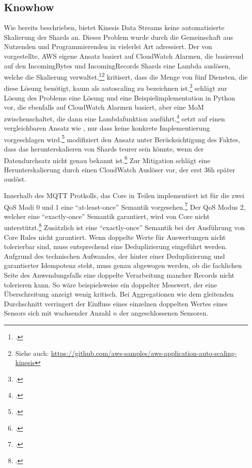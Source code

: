 \subsection{Knowhow}
Wie bereits beschrieben, bietet Kinesis Data Streams keine automatisierte Skalierung der Shards an. Dieses Problem wurde durch die Gemeinschaft aus Nutzenden und Programmierenden in vielerlei Art adressiert. Der von \citeauthor{AmazonWebServices.2018} vorgestellte, \ac{AWS} eigene Ansatz basiert auf CloudWatch Alarmen, die basierend auf den IncomingBytes und IncomingRecords Shards eine Lambda auslösen, welche die Skalierung verwaltet.\footcite[Vgl.][]{AmazonWebServices.2018}\nzitat\footnote{Siehe auch: \url{https://github.com/aws-samples/aws-application-auto-scaling-kinesis}} \citeauthor{Pogosova.28.05.2020} kritisert, dass die Menge von fünf Diensten, die diese Lösung benötigt, kaum als autoscaling zu bezeichnen ist.\footcite[Vgl.][]{Pogosova.28.05.2020} \citeauthor{Stanley.2019} schlägt zur Lösung des Problems eine Lösung und eine Beispielimplementation in Python vor, die ebenfalls auf CloudWatch Alarmen basiert, aber eine \ac{MoM} zwischenschaltet, die dann eine Lambdafunktion ausführt.\footcite[Vgl.][]{Stanley.2019} \citeauthor{Prasath.2019} setzt auf einen vergleichbaren Ansatz wie \citeauthor{Stanley.2019}, nur dass keine konkrete Implementierung vorgeschlagen wird.\footcite[Vgl.][]{Prasath.2019} \citeauthor{Cui.2017} modifiziert den Ansatz unter Berücksichtigung des Faktes, dass das herunterskalieren von Shards teurer sein könnte, wenn der Datendurchsatz nicht genau bekannt ist.\footcite[Vgl. auch im Folgendn][]{Cui.2017} Zur Mitigation schlägt \citeauthor{Cui.2017} eine Herunterskalierung durch einen CloudWatch Auslöser vor, der erst 36h später auslöst.


Innerhalb des MQTT Protkolls, das \AWSIOT{} Core in Teilen implementiert ist für die zwei  \ac{QoS} Modi 0 und 1 eine \enquote{at-least-once} Semantik vorgesehen.\footcite[Vgl. auch im Folgenden][]{OASISOpenConsortium.2014} Der \ac{QoS} Modus 2, welcher eine \enquote{exactly-once} Semantik garantiert, wird von \AWSIOT{} Core nicht unterstützt.\footcite[Vgl.][]{AmazonWebServicesInc..o.J.bd} Zusätzlich ist eine \enquote{exactly-once} Semantik bei der Ausführung von \AWSIOT{} Core Rules nicht garantiert. Wenn doppelte Werte für Auswertungen nicht tolerierbar sind, muss entsprechend eine Deduplizierung eingeführt werden. Aufgrund des technischen Aufwandes, der hinter einer Deduplizierung und garantierter Idempotenz steht, muss genau abgewogen werden, ob die fachlichen Seite des Anwendungsfalls eine doppelte Verarbeitung mancher Records nicht tolerieren kann. So wäre beispielsweise ein doppelter Messwert, der eine Überschreitung anzeigt wenig kritisch. Bei Aggregationen wie dem gleitenden Durchschnitt verringert der Einfluss eines einzelnen doppelten Wertes eines Sensors sich mit wachsender Anzahl $n$ der angeschlossenen Sensoren. 


